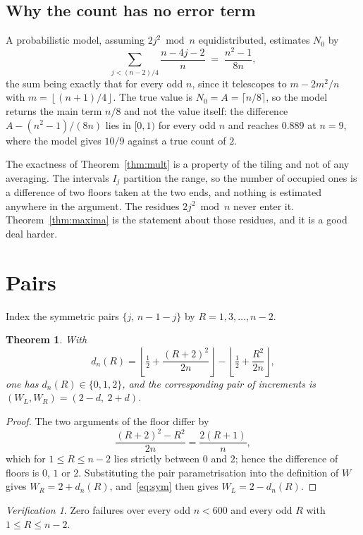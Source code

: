 \documentclass[11pt,reqno]{amsart}
\theoremstyle{plain}
\newtheorem{theorem}{Theorem}
\theoremstyle{remark}
\newtheorem*{verification}{Verification}
\numberwithin{equation}{section}
\newcommand{\fl}[1]{\left\lfloor #1 \right\rfloor}
\begin{document}
\subsection{Why the count has no error term}

A probabilistic model, assuming $2j^2 \bmod n$ equidistributed, estimates $N_0$
by
\[
  \sum_{j < (n-2)/4} \frac{n-4j-2}{n} \;=\; \frac{n^2-1}{8n},
\]
the sum being exactly that for every odd $n$, since it telescopes to
$m - 2m^2/n$ with $m = \fl{(n+1)/4}$. The true value is
$N_0 = A = \lceil n/8\rceil$, so the model returns the main term $n/8$ and not
the value itself: the difference $A - (n^2-1)/(8n)$ lies in $[0,1)$ for every
odd $n$ and reaches $0.889$ at $n = 9$, where the model gives $10/9$ against a
true count of $2$.

The exactness of Theorem~\ref{thm:mult} is a property of the tiling and not of
any averaging. The intervals $I_j$ partition the range, so the number of
occupied ones is a difference of two floors taken at the two ends, and nothing
is estimated anywhere in the argument. The residues $2j^2 \bmod n$ never enter
it. Theorem~\ref{thm:maxima} is the statement about those residues,
and it is a good deal harder.

\section{Pairs}

Index the symmetric pairs $\{j,\,n-1-j\}$ by $R = 1,3,\dots,n-2$.

\begin{theorem}\label{thm:pairs}
With
\[
  d_n(R) = \fl{\tfrac12 + \frac{(R+2)^2}{2n}} - \fl{\tfrac12 + \frac{R^2}{2n}},
\]
one has $d_n(R) \in \{0,1,2\}$, and the corresponding pair of increments is
$(W_L, W_R) = (2-d,\ 2+d)$.
\end{theorem}

\begin{proof}
The two arguments of the floor differ by
\[
  \frac{(R+2)^2-R^2}{2n} = \frac{2(R+1)}{n},
\]
which for $1 \le R \le n-2$ lies strictly between $0$ and $2$; hence the
difference of floors is $0$, $1$ or $2$. Substituting the pair parametrisation
into the definition of $W$ gives $W_R = 2+d_n(R)$, and~\eqref{eq:sym} then gives
$W_L = 2-d_n(R)$.
\end{proof}

\begin{verification}
Zero failures over every odd $n < 600$ and every odd $R$ with $1 \le R \le n-2$.
\end{verification}
\end{document}

